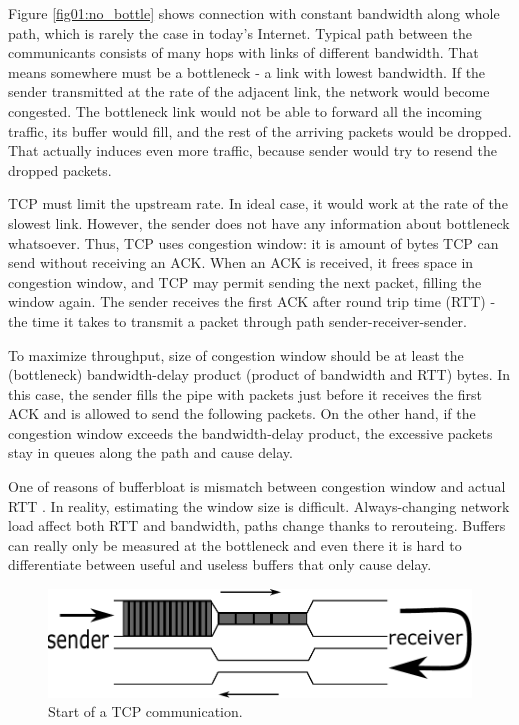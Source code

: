 Figure \ref{fig01:no_bottle} shows connection with constant bandwidth along whole path, which is rarely the case in today's Internet. Typical path between the communicants consists of many hops with links of different bandwidth. That means somewhere must be a bottleneck - a link with lowest bandwidth. If the sender transmitted at the rate of the adjacent link, the network would become congested. The bottleneck link would not be able to forward all the incoming traffic, its buffer would fill, and the rest of the arriving packets would be dropped. That actually induces even more traffic, because sender would try to resend the dropped packets.


TCP must limit the upstream rate. In ideal case, it would work at the rate of the slowest link. However, the sender does not have any information about bottleneck whatsoever. Thus, TCP uses congestion window: it is amount of bytes TCP can send without receiving an ACK. When an ACK is received, it frees space in congestion window, and TCP may permit sending the next packet, filling the window again. The sender receives the first ACK after round trip time (RTT) - the time it takes to transmit a packet through path sender-receiver-sender.

To maximize throughput, size of congestion window should be at least the (bottleneck) bandwidth-delay product (product of bandwidth and RTT) bytes. In this case, the sender fills the pipe with packets just before it receives the first ACK and is allowed to send the following packets. On the other hand, if the congestion window exceeds the bandwidth-delay product, the excessive packets stay in queues along the path and cause delay. 

One of reasons of bufferbloat is mismatch between congestion window and actual RTT \cite{CoDel}. In reality, estimating the window size is difficult. Always-changing network load affect both RTT and bandwidth, paths change thanks to rerouteing. Buffers can really only be measured at the bottleneck and even there it is hard to differentiate between useful and useless buffers that only cause delay.

\begin{figure}
	\centering
	\includegraphics[width=137mm]{drawings/tcp_bottleneck_1}
	\caption{Start of a TCP communication.}
	
	\label{fig02:bottle_1}
\end{figure}


